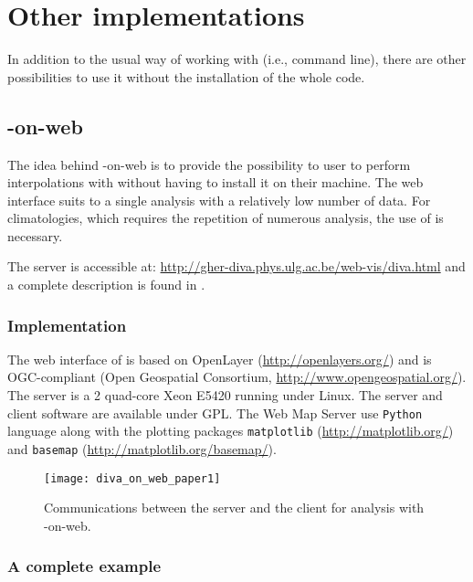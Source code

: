 \chapter{Other implementations\label{chap:divaonweb}}

In addition to the usual way of working with \diva (i.e., command line), there are other possibilities to use it without the installation of the whole code.
 
\minitoc

\newpage %

\section{\diva-on-web}

The idea behind \diva-on-web is to provide the possibility to user to perform interpolations with \diva without having to install it on their machine. The web interface suits to a single analysis with a relatively low number of data. For climatologies, which requires the repetition of numerous analysis, the use of \diva is necessary.

The server is accessible at: \url{http://gher-diva.phys.ulg.ac.be/web-vis/diva.html} and a complete description is found in \citet{BARTH10}.


\subsection{Implementation}

The web interface of \diva is based on OpenLayer (\url{http://openlayers.org/}) and is OGC-compliant (Open Geospatial Consortium, \url{http://www.opengeospatial.org/}). The server is a 2 quad-core Xeon E5420 running under Linux. The server and client software are available under GPL. The Web Map Server use \texttt{Python} language along with the plotting packages \texttt{matplotlib} (\url{http://matplotlib.org/}) and \texttt{basemap} (\url{http://matplotlib.org/basemap/}). 

\begin{figure}[htpb]
	\centering
	\parbox{.5\textwidth}{
		\texttt{[image: diva\_on\_web\_paper1]}
		}\parbox{.5\textwidth}{
		\caption{Communications between the server and the client for analysis with \diva-on-web.\label{fig:diva_on_web_paper1}}
		}
\end{figure}

\subsection{A complete example}

